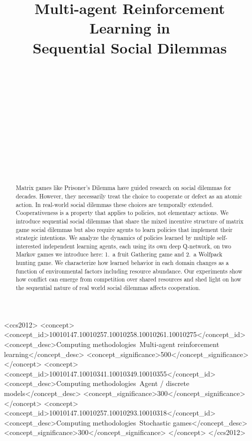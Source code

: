 \documentclass{aamas2017}
\title{Multi-agent Reinforcement Learning in\\Sequential Social Dilemmas}
\author{
%
\alignauthor {\normalsize \bf Joel Z. Leibo$^1$}\\
\affaddr{{\small DeepMind, London, UK}}\\
\email{{\small jzl@google.com}}
\alignauthor {\normalsize \bf Vinicius Zambaldi$^1$}\\
\affaddr{{\small DeepMind, London, UK}}\\
\email{{\small vzambaldi@google.com}}
\alignauthor {\normalsize \bf Marc Lanctot}\\
\affaddr{{\small DeepMind, London, UK}}\\
\email{{\small lanctot@google.com}}
\and  %
\vspace{0.1cm}
\alignauthor {\normalsize \bf Janusz Marecki}\\
\affaddr{{\small DeepMind, London, UK}}\\
\email{{\small tartel@google.com}}
\alignauthor {\normalsize \bf Thore Graepel}\\
\affaddr{{\small DeepMind, London, UK}}\\
\email{{\small thore@google.com}}
}
\begin{document}
\maketitle

\begin{abstract}
Matrix games like Prisoner's Dilemma have guided research on social dilemmas for decades. However, they necessarily treat the choice to cooperate or defect as an atomic action. In real-world social dilemmas these choices are temporally extended. Cooperativeness is a property that applies to policies, not elementary actions. We introduce sequential social dilemmas that share the mixed incentive structure of matrix game social dilemmas but also require agents to learn policies that implement their strategic intentions. We analyze the dynamics of policies learned by multiple self-interested independent learning agents, each using its own deep Q-network, on two Markov games we introduce here: 1.\ a fruit Gathering game and 2.\ a Wolfpack hunting game. We characterize how learned behavior in each domain changes as a function of environmental factors including resource abundance. Our experiments show how conflict  can emerge from competition over shared resources and shed light on how the sequential nature of real world social dilemmas affects cooperation.
\end{abstract}

\begin{CCSXML}
<ccs2012>
<concept>
<concept_id>10010147.10010257.10010258.10010261.10010275</concept_id>
<concept_desc>Computing methodologies~Multi-agent reinforcement learning</concept_desc>
<concept_significance>500</concept_significance>
</concept>
<concept>
<concept_id>10010147.10010341.10010349.10010355</concept_id>
<concept_desc>Computing methodologies~Agent / discrete models</concept_desc>
<concept_significance>300</concept_significance>
</concept>
<concept>
<concept_id>10010147.10010257.10010293.10010318</concept_id>
<concept_desc>Computing methodologies~Stochastic games</concept_desc>
<concept_significance>300</concept_significance>
</concept>
</ccs2012>
\end{CCSXML}


\printccsdesc
\end{document}
